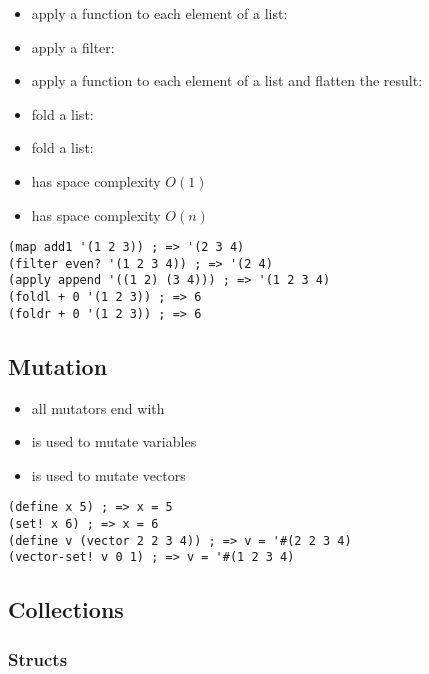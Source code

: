 \documentclass[a4paper,landscape,10pt]{article}
\begin{document}
\begin{multicols*}{2}
  \begin{itemize}
    \item apply a function to each element of a list: 
    \item apply a filter: 
    \item apply a function to each element of a list and flatten the result: 
    \item fold a list: 
    \item fold a list: 
    \item {} has space complexity \(O(1)\)
    \item {} has space complexity \(O(n)\)
  \end{itemize}

  \begin{lstlisting}[language=Racket]
(map add1 '(1 2 3)) ; => '(2 3 4)
(filter even? '(1 2 3 4)) ; => '(2 4)
(apply append '((1 2) (3 4))) ; => '(1 2 3 4)
(foldl + 0 '(1 2 3)) ; => 6
(foldr + 0 '(1 2 3)) ; => 6
\end{lstlisting}

  \subsection{Mutation}

  \begin{itemize}
    \item all mutators end with \iracket{\!}
    \item {} is used to mutate variables
    \item {} is used to mutate vectors
  \end{itemize}

  \begin{lstlisting}[language=Racket]
(define x 5) ; => x = 5
(set! x 6) ; => x = 6
(define v (vector 2 2 3 4)) ; => v = '#(2 2 3 4)
(vector-set! v 0 1) ; => v = '#(1 2 3 4)
\end{lstlisting}

  \breakcolumn

  \subsection{Collections}

  \subsubsection{Structs}


\end{multicols*}
\end{document}
